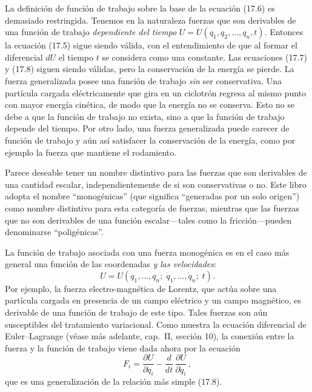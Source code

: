 \documentclass[12pt,a4paper]{book}
\begin{document}
\begin{center}
La definici\'on de funci\'on de trabajo sobre la base de la ecuaci\'on (17.6) es demasiado restringida. Tenemos en la naturaleza fuerzas que son derivables de una funci\'on de trabajo \textit{dependiente del tiempo} $U = U(q_1, q_2, \ldots, q_n, t)$. Entonces la ecuaci\'on (17.5) sigue siendo v\'alida, con el entendimiento de que al formar el diferencial $dU$ el tiempo $t$ se considera como una constante. Las ecuaciones (17.7) y (17.8) siguen siendo v\'alidas, pero la conservaci\'on de la energ\'ia se pierde. La fuerza generalizada posee una funci\'on de trabajo \textit{sin} ser conservativa. Una part\'icula cargada el\'ectricamente que gira en un ciclotr\'on regresa al mismo punto con mayor energ\'ia cin\'etica, de modo que la energ\'ia no se conserva. Esto no se debe a que la funci\'on de trabajo no exista, sino a que la funci\'on de trabajo depende del tiempo. Por otro lado, una fuerza generalizada puede carecer de funci\'on de trabajo y a\'un as\'i satisfacer la conservaci\'on de la energ\'ia, como por ejemplo la fuerza que mantiene el rodamiento.

Parece deseable tener un nombre distintivo para las fuerzas que son derivables de una cantidad escalar, independientemente de si son conservativas o no. Este libro adopta el nombre ``monog\'enicas'' (que significa ``generadas por un solo origen'') como nombre distintivo para esta categor\'ia de fuerzas, mientras que las fuerzas que no son derivables de una funci\'on escalar---tales como la fricci\'on---pueden denominarse ``polig\'enicas''.

La funci\'on de trabajo asociada con una fuerza monog\'enica es en el caso m\'as general una funci\'on de las coordenadas \textit{y las velocidades}:
\begin{equation}
U = U(q_1, \ldots, q_n;\; \dot{q}_1, \ldots, \dot{q}_n;\; t).
\tag{17.12}
\end{equation}
Por ejemplo, la fuerza electro-magn\'etica de Lorentz, que act\'ua sobre una part\'icula cargada en presencia de un campo el\'ectrico y un campo magn\'etico, es derivable de una funci\'on de trabajo de este tipo. Tales fuerzas son a\'un susceptibles del tratamiento variacional. Como muestra la ecuaci\'on diferencial de Euler--Lagrange (v\'ease m\'as adelante, cap.\ II, secci\'on 10), la conexi\'on entre la fuerza y la funci\'on de trabajo viene dada ahora por la ecuaci\'on
\begin{equation}
F_i = \frac{\partial U}{\partial q_i} - \frac{d}{dt}\,\frac{\partial U}{\partial \dot{q}_i}\,,
\tag{17.13}
\end{equation}
que es una generalizaci\'on de la relaci\'on m\'as simple (17.8).


\end{center}
\end{document}
